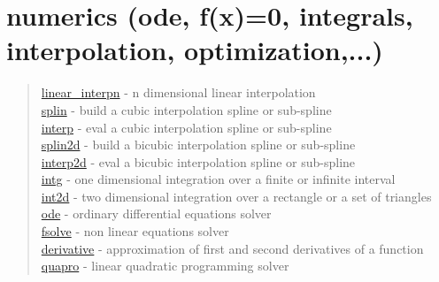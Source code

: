 \chapter*{numerics (ode, f(x)=0, integrals, interpolation,
  optimization,...)}


\begin{quote}
\noindent
\hyperlink{linear_interpn}{linear\_interpn} - n dimensional linear interpolation \\
\hyperlink{splin}{splin} - build a cubic interpolation spline or sub-spline \\
\hyperlink{interp}{interp} - eval a cubic interpolation spline or sub-spline \\
\hyperlink{splin2d}{splin2d} - build a bicubic interpolation spline or sub-spline \\
\hyperlink{interp2d}{interp2d} - eval a bicubic interpolation spline or sub-spline \\
\hyperlink{intg}{intg} - one dimensional integration over a finite or infinite interval \\
\hyperlink{int2d}{int2d} - two dimensional integration over a rectangle or a set of triangles \\
\hyperlink{ode}{ode} - ordinary differential equations solver \\
\hyperlink{fsolve}{fsolve} - non linear equations solver \\
\hyperlink{derivative}{derivative} - approximation of first and second derivatives of a function\\
\hyperlink{quapro}{quapro} - linear quadratic programming solver \\
\end{quote}



  


 
  
 
 
 
 
 
